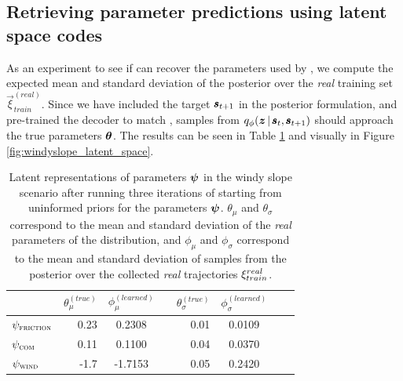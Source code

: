 \subsection{Retrieving parameter predictions using latent space codes}

As an experiment to see if \dettostoc{} can recover the parameters used by \fsimulator{}, we compute the expected mean and standard deviation of the posterior over the \emph{real} training set $\vec{\xi}^{(real)}_{train}$. Since we have included the target $\pmb{s}_{t+1}$ in the posterior formulation, and pre-trained the decoder to match \fsimulator{}, samples from $\qphi \given{\vz}{\vs, \vns}$ should approach the true parameters $\boldsymbol{\theta}$. The results can be seen in Table \ref{fig_3_parameters_table} and visually in Figure \ref{fig:windyslope_latent_space}.

\begin{table}[h!]
\centering
\begin{tabular}{lrcrrcrr}
\toprule
& $\theta_\mu^{(true)}$ & $\phi_\mu^{(learned)}$ && $\theta_\sigma^{(true)}$ & $\phi_\sigma^{(learned)}$ \\
\midrule
$\psi_{\textsc{friction}}$ & 0.23 & 0.2308 && 0.01 & 0.0109 \\
$\psi_{\textsc{com}}$ & 0.11 & 0.1100 && 0.04 & 0.0370 \\
$\psi_{\textsc{wind}}$ & -1.7 & -1.7153 && 0.05 & 0.2420 \\
\bottomrule
\end{tabular}
\caption{Latent representations of parameters $\boldsymbol{\psi}$ in the windy slope scenario after running three iterations of \dettostoc{} starting from uninformed priors for the parameters $\boldsymbol{\psi}$. $\theta_\mu$ and $\theta_\sigma$ correspond to the mean and standard deviation of the \emph{real} parameters of the distribution, and $\phi_\mu$ and $\phi_\sigma$ correspond to the mean and standard deviation of samples from the posterior over the collected \emph{real} trajectories $\xi^{real}_{train}$.}
\label{fig_3_parameters_table}
\end{table}


